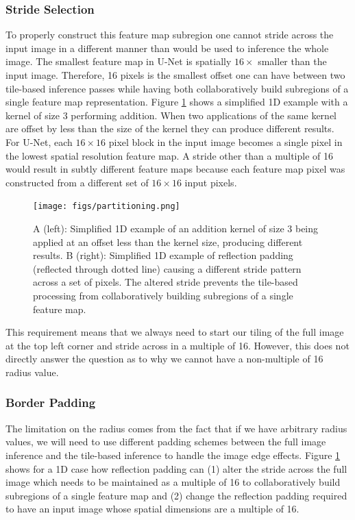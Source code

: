 \documentclass[runningheads]{llncs}
\begin{document}
\subsubsection{Stride Selection}
To properly construct this feature map subregion one cannot stride across the input image in a different manner than would be used to inference the whole image. The smallest feature map in U-Net is spatially $16 \times$ smaller than the input image. Therefore, 16 pixels is the smallest offset one can have between two tile-based inference passes while having both collaboratively build subregions of a single feature map representation. Figure \ref{fig:offset} shows a simplified 1D example with a kernel of size 3 performing addition. When two applications of the same kernel are offset by less than the size of the kernel they can produce different results. 
For U-Net, each $16 \times 16$ pixel block in the input image becomes a single pixel in the lowest spatial resolution feature map. A stride other than a multiple of 16 would result in subtly different feature maps because each feature map pixel was constructed from a different set of $16 \times 16$ input pixels. 

\begin{figure}[h!]
	\centering
		\texttt{[image: figs/partitioning.png]}
	\caption{A (left): Simplified 1D example of an addition kernel of size 3 being applied at an offset less than the kernel size, producing different results.
	B (right): Simplified 1D example of reflection padding (reflected through dotted line) causing a different stride pattern across a set of pixels. The altered stride prevents the tile-based processing from collaboratively building subregions of a single feature map.}
	\label{fig:offset}
\end{figure}

This requirement means that we always need to start our tiling of the full image at the top left corner and stride across in a multiple of 16. However, this does not directly answer the question as to why we cannot have a non-multiple of 16 radius value. 

\subsubsection{Border Padding}
The limitation on the radius comes from the fact that if we have arbitrary radius values, we will need to use different padding schemes between the full image inference and the tile-based inference to handle the image edge effects. Figure \ref{fig:offset} shows for a 1D case how reflection padding can (1) alter the stride across the full image which needs to be maintained as a multiple of 16 to collaboratively build subregions of a single feature map and (2) change the reflection padding required to have an input image whose spatial dimensions are a multiple of 16.
\end{document}
